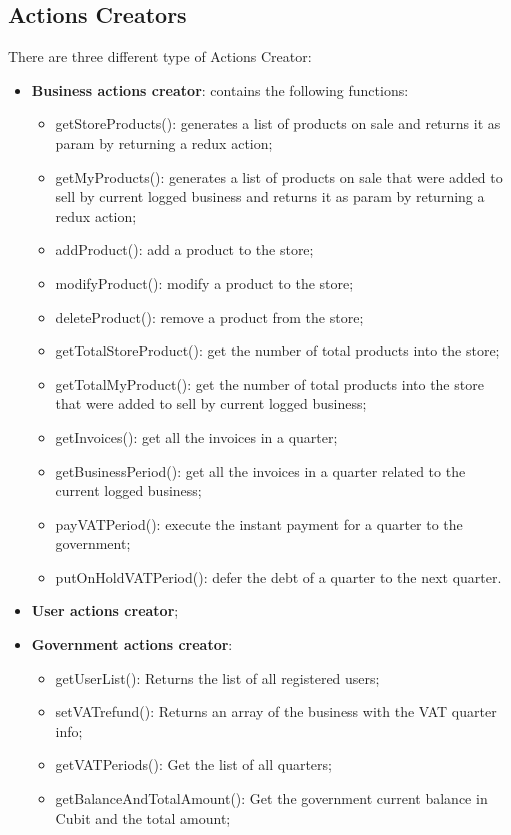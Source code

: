 \subsection{Actions Creators}
There are three different type of Actions Creator:
\begin{itemize}
	\item \textbf{Business actions creator}: contains the following functions: 
	\begin{itemize}
		\item getStoreProducts(): generates a list of products on sale and returns it as param by returning a redux action;
		\item getMyProducts(): generates a list of products on sale that were added to sell by current logged business and returns it as param by returning a redux action;
		\item addProduct(): add a product to the store;
		\item modifyProduct(): modify a product to the store;
		\item deleteProduct(): remove a product from the store;
		\item getTotalStoreProduct(): get the number of total products into the store;
		\item getTotalMyProduct(): get the number of total products into the store that were added to sell by current logged business;
		\item getInvoices(): get all the invoices in a quarter;
		\item getBusinessPeriod(): get all the invoices in a quarter related to the current logged business;
		\item payVATPeriod(): execute the instant payment for a quarter to the government;
		\item putOnHoldVATPeriod(): defer the debt of a quarter to the next quarter.
	\end{itemize}
	\item \textbf{User actions creator};
	\item \textbf{Government actions creator}:
	\begin{itemize}
		\item getUserList(): Returns the list of all registered users;
		\item setVATrefund(): Returns an array of the business with the VAT quarter info;
		\item getVATPeriods(): Get the list of all quarters;
		\item getBalanceAndTotalAmount(): Get the government current balance in Cubit and the total amount;

\end{itemize}
\end{itemize}
